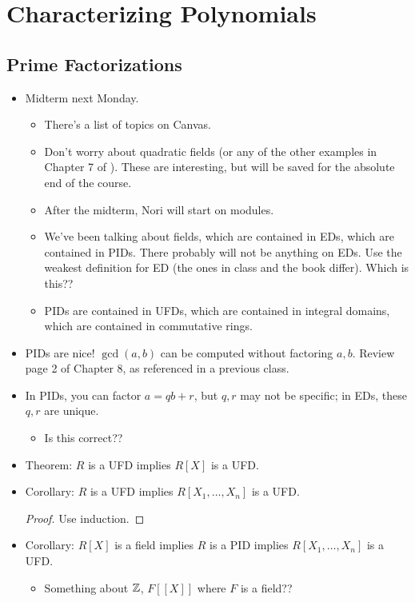 \documentclass[../notes.tex]{subfiles}
\begin{document}
\chapter{Characterizing Polynomials}
\section{Prime Factorizations}
\begin{itemize}
    \item {}Midterm next Monday.
    \begin{itemize}
        \item There's a list of topics on Canvas.
        \item Don't worry about quadratic fields (or any of the other examples in Chapter 7 of \textcite{bib:DummitFoote}). These are interesting, but will be saved for the absolute end of the course.
        \item After the midterm, Nori will start on modules.
        \item We've been talking about fields, which are contained in EDs, which are contained in PIDs. There probably will not be anything on EDs. Use the weakest definition for ED (the ones in class and the book differ). Which is this??
        \item PIDs are contained in UFDs, which are contained in integral domains, which are contained in commutative rings.
    \end{itemize}
    \item PIDs are nice! $\gcd(a,b)$ can be computed without factoring $a,b$. Review page 2 of Chapter 8, as referenced in a previous class.
    \item In PIDs, you can factor $a=qb+r$, but $q,r$ may not be specific; in EDs, these $q,r$ are unique.
    \begin{itemize}
        \item Is this correct??
    \end{itemize}
    \item Theorem: $R$ is a UFD implies $R[X]$ is a UFD.
    \item Corollary: $R$ is a UFD implies $R[X_1,\dots,X_n]$ is a UFD.
    \begin{proof}
        Use induction.
    \end{proof}
    \item Corollary: $R[X]$ is a field implies $R$ is a PID implies $R[X_1,\dots,X_n]$ is a UFD.
    \begin{itemize}
        \item Something about $\mathbb{Z}$, $F[[X]]$ where $F$ is a field??

\end{itemize}
\end{itemize}
\end{document}
